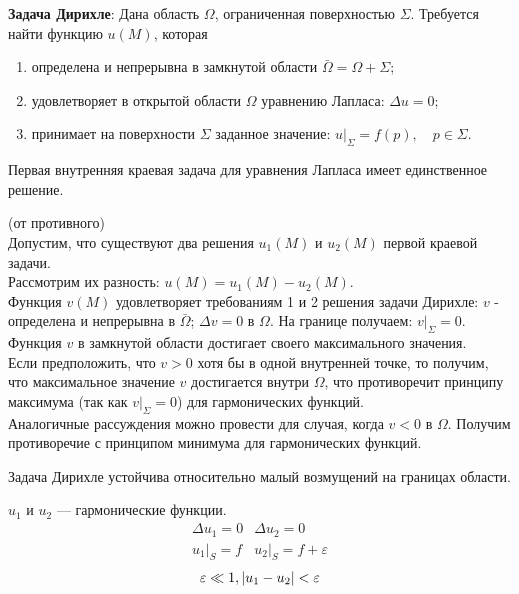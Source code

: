 \textbf{Задача Дирихле}:
	Дана область $\Omega$, ограниченная поверхностью $\Sigma$. Требуется найти функцию $u(M)$, которая 
\begin{enumerate}
	\item определена и непрерывна в замкнутой области $\bar \Omega = \Omega + \Sigma$;\\
	\item удовлетворяет в открытой области $\Omega$ уравнению Лапласа: $\Delta u = 0$;
	\item принимает на поверхности $\Sigma$ заданное значение: $u\Big|_\Sigma = f(p), \quad p \in \Sigma$. 
\end{enumerate}
\begin{theo}
	Первая внутренняя краевая задача для уравнения Лапласа имеет единственное решение.	
\end{theo}

\begin{qproof} (от противного)\\
Допустим, что существуют два решения $u_1(M)$ и $u_2(M)$ первой краевой задачи.\\

Рассмотрим их разность:   $u(M) = u_1(M) - u_2(M)$. \\

Функция $v(M)$ удовлетворяет требованиям 1 и 2 решения задачи Дирихле:   $v$ - определена и непрерывна в $\bar \Omega$; $\Delta v = 0$ в $\Omega$. На границе  получаем: $v\Big|_\Sigma = 0$.\\ 

Функция $v$ в замкнутой области достигает своего максимального значения. \\

Если предположить, что $v > 0$ хотя бы в одной внутренней точке, то получим, что максимальное значение $v$ достигается внутри $\Omega$, что противоречит принципу максимума (так как $v\Big|_\Sigma = 0$) для гармонических функций. \\

Аналогичные рассуждения можно провести для случая, когда $v < 0$ в $\Omega$. Получим противоречие с принципом минимума для гармонических функций. 
\end{qproof}

\begin{theo}
	Задача Дирихле устойчива относительно малый возмущений на границах области.
\end{theo}
\begin{qproof}
	$u_1$ и $u_2$ --- гармонические функции.
	\begin{align*}
		\Delta u_1 = 0 &\Delta u _2 = 0\\
		u_1 \big|_S = f & u_2 \big|_S = f + \varepsilon
	\end{align*}
	\[
		\varepsilon \ll 1, \left | u_1 - u_2 \right | < \varepsilon
	\]
\end{qproof}


